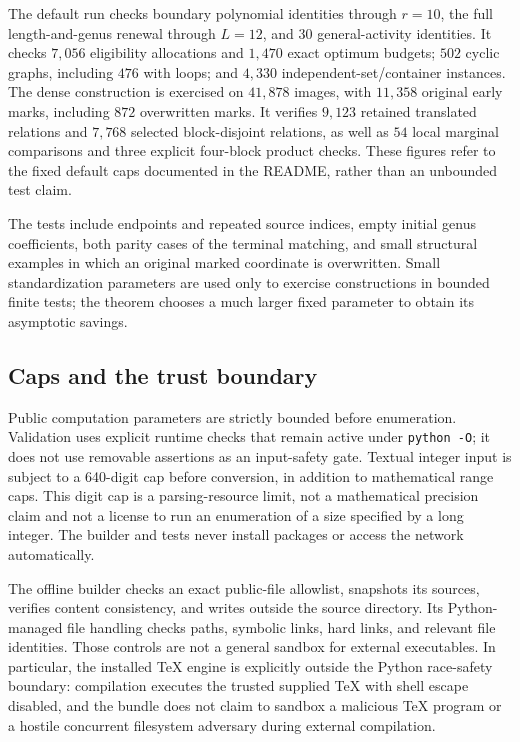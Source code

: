 \documentclass[11pt,letterpaper]{article}
\theoremstyle{definition}
\begin{document}
The default run checks boundary polynomial identities through $r=10$, the full length-and-genus renewal through $L=12$, and $30$ general-activity identities. It checks $7{,}056$ eligibility allocations and $1{,}470$ exact optimum budgets; $502$ cyclic graphs, including $476$ with loops; and $4{,}330$ independent-set/container instances. The dense construction is exercised on $41{,}878$ images, with $11{,}358$ original early marks, including $872$ overwritten marks. It verifies $9{,}123$ retained translated relations and $7{,}768$ selected block-disjoint relations, as well as $54$ local marginal comparisons and three explicit four-block product checks. These figures refer to the fixed default caps documented in the README, rather than an unbounded test claim.

The tests include endpoints and repeated source indices, empty initial genus coefficients, both parity cases of the terminal matching, and small structural examples in which an original marked coordinate is overwritten. Small standardization parameters are used only to exercise constructions in bounded finite tests; the theorem chooses a much larger fixed parameter to obtain its asymptotic savings.

\subsection{Caps and the trust boundary}
Public computation parameters are strictly bounded before enumeration. Validation uses explicit runtime checks that remain active under \texttt{python -O}; it does not use removable assertions as an input-safety gate. Textual integer input is subject to a 640-digit cap before conversion, in addition to mathematical range caps. This digit cap is a parsing-resource limit, not a mathematical precision claim and not a license to run an enumeration of a size specified by a long integer. The builder and tests never install packages or access the network automatically.

The offline builder checks an exact public-file allowlist, snapshots its sources, verifies content consistency, and writes outside the source directory. Its Python-managed file handling checks paths, symbolic links, hard links, and relevant file identities. Those controls are not a general sandbox for external executables. In particular, the installed TeX engine is explicitly outside the Python race-safety boundary: compilation executes the trusted supplied TeX with shell escape disabled, and the bundle does not claim to sandbox a malicious TeX program or a hostile concurrent filesystem adversary during external compilation.
\end{document}
